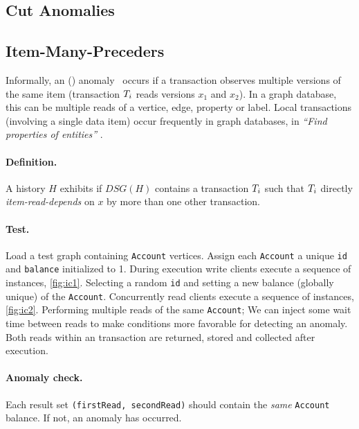 \subsection{Cut Anomalies}

\subsection*{Item-Many-Preceders}
\label{sec:cut-anomalies}

Informally, an  ()
anomaly~\cite{DBLP:journals/pvldb/BailisDFGHS13} occurs if a transaction observes
multiple versions of the same item (\eg transaction $T_i$ reads versions
$x_1$ and $x_2$). In a graph database, this can be multiple reads of a vertice, edge,
property or label. Local transactions (involving a single data item) occur
frequently in graph databases, \eg in \emph{``Find properties of entities''}
.

\paragraph{Definition.}
A history $H$ exhibits  if $\textit{DSG}(H)$ contains a transaction
$T_i$ such that $T_i$ directly \emph{item-read-depends} on $x$ by more
than one other transaction.

\paragraph{Test.}
Load a test graph containing \texttt{Account} vertices. Assign each \texttt{Account}
a unique \texttt{id} and \texttt{balance} initialized to 1. During execution
write clients execute a sequence of  instances, \autoref{fig:ic1}.
Selecting a random \texttt{id} and setting a new balance (globally unique) of the
\texttt{Account}. Concurrently read clients execute a sequence of 
instances, \autoref{fig:ic2}. Performing multiple reads of the same \texttt{Account};
We can inject some wait time between reads to make conditions more favorable
for detecting an anomaly. Both reads within an 
transaction are returned, stored and collected after execution.

\paragraph{Anomaly check.}
Each  result set \texttt{(firstRead, secondRead)} should
contain the \emph{same} \texttt{Account} balance. If not, an 
anomaly has occurred.

